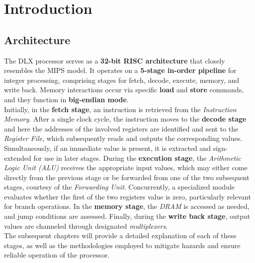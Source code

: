\chapter{Introduction}
\label{chap:01_introduction}

\section{Architecture}
\label{sec:architecture}
The DLX processor serves as a \textbf{32-bit RISC architecture} that closely resembles the MIPS model. It operates on a \textbf{5-stage in-order pipeline} for integer processing, comprising stages for fetch, decode, execute, memory, and write back. Memory interactions occur via specific \textbf{load} and \textbf{store} commands, and they function in \textbf{big-endian mode}. \\

Initially, in the \textbf{fetch stage}, an instruction is retrieved from the \textit{Instruction Memory}. After a single clock cycle, the instruction moves to the \textbf{decode stage} and here the addresses of the involved registers are identified and sent to the \textit{Register File}, which subsequently reads and outputs the corresponding values. Simultaneously, if an immediate value is present, it is extracted and sign-extended for use in later stages. During the \textbf{execution stage}, the \textit{Arithmetic Logic Unit (ALU)} receives the appropriate input values, which may either come directly from the previous stage or be forwarded from one of the two subsequent stages, courtesy of the \textit{Forwarding Unit}. Concurrently, a specialized module evaluates whether the first of the two registers value is zero, particularly relevant for branch operations. In the \textbf{memory stage}, the \textit{DRAM} is accessed as needed, and jump conditions are assessed. Finally, during the \textbf{write back stage}, output values are channeled through designated \textit{multiplexers}. \\

The subsequent chapters will provide a detailed explanation of each of these stages, as well as the methodologies employed to mitigate hazards and ensure reliable operation of the processor. %


